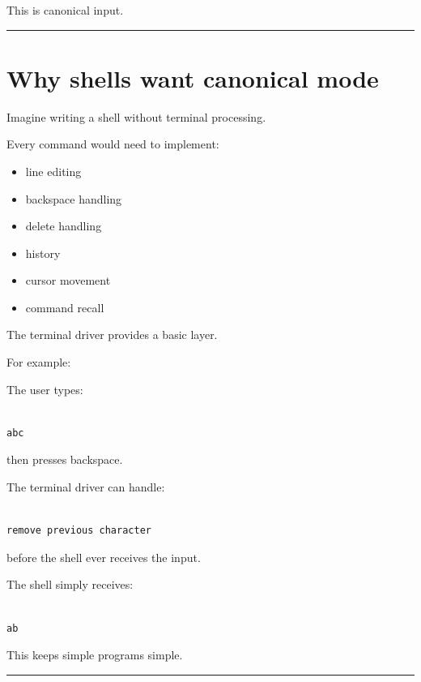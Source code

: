 \documentclass[
  oneside,
  openany]{book}
\providecommand{\tightlist}{%
  \setlength{\itemsep}{0pt}\setlength{\parskip}{0pt}}
\begin{document}
This is canonical input.

\begin{center}\rule{0.5\linewidth}{0.5pt}\end{center}

\hypertarget{why-shells-want-canonical-mode}{%
\section{Why shells want canonical
mode}\label{why-shells-want-canonical-mode}}

Imagine writing a shell without terminal processing.

Every command would need to implement:

\begin{itemize}
\tightlist
\item
  line editing
\item
  backspace handling
\item
  delete handling
\item
  history
\item
  cursor movement
\item
  command recall
\end{itemize}

The terminal driver provides a basic layer.

For example:

The user types:

\begin{verbatim}

abc
\end{verbatim}

then presses backspace.

The terminal driver can handle:

\begin{verbatim}

remove previous character
\end{verbatim}

before the shell ever receives the input.

The shell simply receives:

\begin{verbatim}

ab
\end{verbatim}

This keeps simple programs simple.

\begin{center}\rule{0.5\linewidth}{0.5pt}\end{center}
\end{document}
